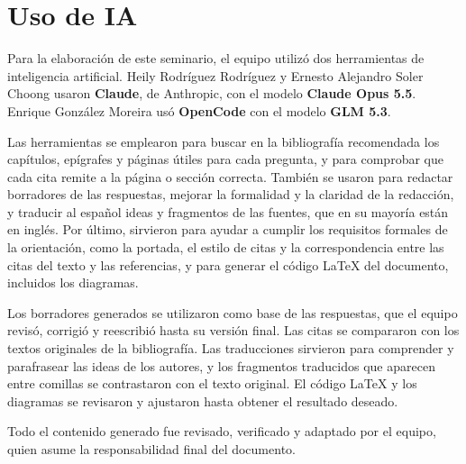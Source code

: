 
\chapter*{Uso de IA}

Para la elaboración de este seminario, el equipo utilizó dos herramientas de inteligencia artificial. Heily Rodríguez Rodríguez y Ernesto Alejandro Soler Choong usaron \textbf{Claude}, de Anthropic, con el modelo \textbf{Claude Opus 5.5}. Enrique González Moreira usó \textbf{OpenCode} con el modelo \textbf{GLM 5.3}.

Las herramientas se emplearon para buscar en la bibliografía recomendada los capítulos, epígrafes y páginas útiles para cada pregunta, y para comprobar que cada cita remite a la página o sección correcta. También se usaron para redactar borradores de las respuestas, mejorar la formalidad y la claridad de la redacción, y traducir al español ideas y fragmentos de las fuentes, que en su mayoría están en inglés. Por último, sirvieron para ayudar a cumplir los requisitos formales de la orientación, como la portada, el estilo de citas y la correspondencia entre las citas del texto y las referencias, y para generar el código \LaTeX{} del documento, incluidos los diagramas.

Los borradores generados se utilizaron como base de las respuestas, que el equipo revisó, corrigió y reescribió hasta su versión final. Las citas se compararon con los textos originales de la bibliografía. Las traducciones sirvieron para comprender y parafrasear las ideas de los autores, y los fragmentos traducidos que aparecen entre comillas se contrastaron con el texto original. El código \LaTeX{} y los diagramas se revisaron y ajustaron hasta obtener el resultado deseado.

Todo el contenido generado fue revisado, verificado y adaptado por el equipo, quien asume la responsabilidad final del documento.
